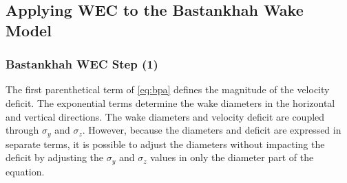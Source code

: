 \documentclass[hidelinks,sort&compress,AMA,STIX1COL]{WileyNJD-v2}
\begin{document}
\subsection{Applying WEC to the Bastankhah Wake Model}

\subsubsection{Bastankhah WEC Step (1)}
The first parenthetical term of \cref{eq:bpa} defines the magnitude of the velocity deficit. The exponential terms determine the wake diameters in the horizontal and vertical directions. The wake diameters and velocity deficit are coupled through $\sigma_y$ and $\sigma_z$. However, because the diameters and deficit are expressed in separate terms, it is possible to adjust the diameters without impacting the deficit by adjusting the $\sigma_y$ and $\sigma_z$ values in only the diameter part of the equation. 
\end{document}
